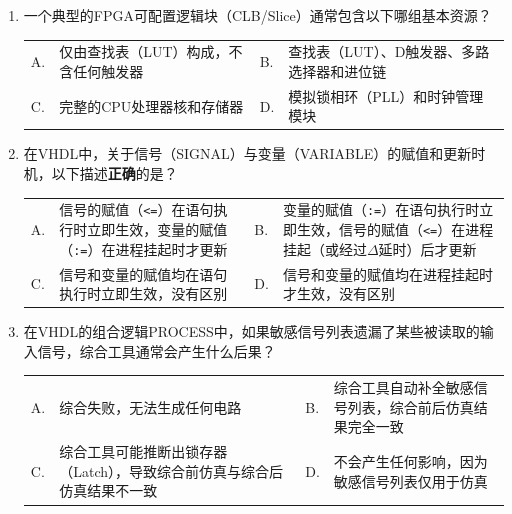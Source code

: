 \begin{enumerate}[label=\arabic*.]

\item 一个典型的FPGA可配置逻辑块（CLB/Slice）通常包含以下哪组基本资源？

\vspace{0.3cm}

\begin{tabular}{@{}lp{}@{\qquad}lp{}@{}}
A. & 仅由查找表（LUT）构成，不含任何触发器 &
B. & 查找表（LUT）、D触发器、多路选择器和进位链 \\
C. & 完整的CPU处理器核和存储器 &
D. & 模拟锁相环（PLL）和时钟管理模块 \\
\end{tabular}

\vspace{0.8cm}

\item 在VHDL中，关于信号（SIGNAL）与变量（VARIABLE）的赋值和更新时机，以下描述\textbf{正确}的是？

\vspace{0.3cm}

\begin{tabular}{@{}lp{}@{\qquad}lp{}@{}}
A. & 信号的赋值（\texttt{<=}）在语句执行时立即生效，变量的赋值（\texttt{:=}）在进程挂起时才更新 &
B. & 变量的赋值（\texttt{:=}）在语句执行时立即生效，信号的赋值（\texttt{<=}）在进程挂起（或经过$\Delta$延时）后才更新 \\
C. & 信号和变量的赋值均在语句执行时立即生效，没有区别 &
D. & 信号和变量的赋值均在进程挂起时才生效，没有区别 \\
\end{tabular}

\vspace{0.8cm}

\item 在VHDL的组合逻辑PROCESS中，如果敏感信号列表遗漏了某些被读取的输入信号，综合工具通常会产生什么后果？

\vspace{0.3cm}

\begin{tabular}{@{}lp{}@{\qquad}lp{}@{}}
A. & 综合失败，无法生成任何电路 &
B. & 综合工具自动补全敏感信号列表，综合前后仿真结果完全一致 \\
C. & 综合工具可能推断出锁存器（Latch），导致综合前仿真与综合后仿真结果不一致 &
D. & 不会产生任何影响，因为敏感信号列表仅用于仿真 \\
\end{tabular}


\end{enumerate}
